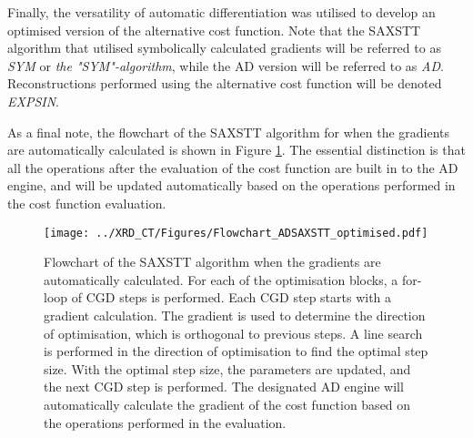 Finally, the versatility of automatic differentiation was utilised to develop an optimised version of the alternative cost function.
Note that the SAXSTT algorithm that utilised symbolically calculated gradients will be referred to as \emph{SYM} or \emph{the "SYM"-algorithm},
while the AD version will be referred to as \emph{AD}. Reconstructions performed using the alternative cost function will be denoted \emph{EXPSIN}.




As a final note, the flowchart of the SAXSTT algorithm for when the gradients are automatically calculated is shown in Figure \ref{fig:flowchart_ADSAXSTT}.
The essential distinction is that all the operations after the evaluation of the cost function are built in to the AD engine, and will be updated automatically
based on the operations performed in the cost function evaluation.

\begin{figure}
    \centering
    \texttt{[image: ../XRD\_CT/Figures/Flowchart\_ADSAXSTT\_optimised.pdf]}
    \caption[Flowchart of AD SAXSTT]{Flowchart of the SAXSTT algorithm when the gradients are automatically calculated.
        For each of the optimisation blocks, a for-loop of CGD steps is performed.
        Each CGD step starts with a gradient calculation.
        The gradient is used to determine the direction of optimisation, which is orthogonal to previous steps.
        A line search is performed in the direction of optimisation to find the optimal step size.
        With the optimal step size, the parameters are updated, and the next CGD step is performed.
        The designated AD engine will automatically calculate the gradient of the cost function based on the operations performed in the evaluation.
    }
    \label{fig:flowchart_ADSAXSTT}
\end{figure}